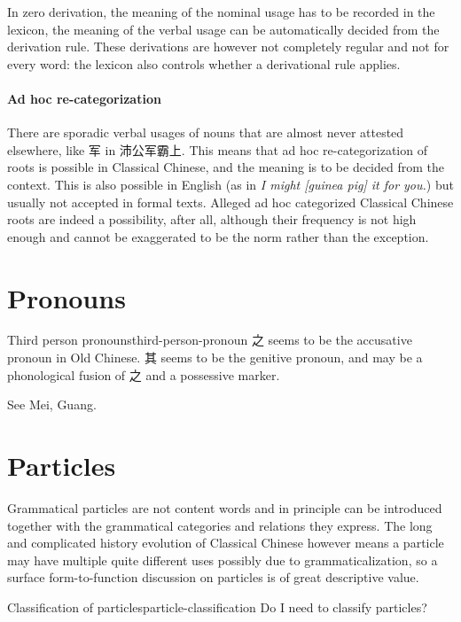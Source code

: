 \documentclass[UTF8, a4paper, oneside, scheme=plain, 12pt]{ctexrep}
\newcommand{\form}[1]{\emph{#1}}
\begin{document}
In zero derivation, the meaning of the nominal usage has to be recorded in the lexicon,
the meaning of the verbal usage can be automatically decided from the derivation rule.
These derivations are however not completely regular and not for every word:
the lexicon also controls whether a derivational rule applies.

\paragraph*{Ad hoc re-categorization}
There are sporadic verbal usages of nouns that are almost never attested elsewhere,
like 军 in 沛公军霸上.
This means that ad hoc re-categorization of roots is possible in Classical Chinese,
and the meaning is to be decided from the context.
This is also possible in English
(as in \form{I might [guinea pig] it for you.}) 
but usually not accepted in formal texts.
Alleged ad hoc categorized Classical Chinese roots are indeed a possibility, after all,
although their frequency is not high enough and cannot be exaggerated to be the norm rather than the exception.

\section{Pronouns}

\begin{todobox}{Third person pronouns}{third-person-pronoun}
    之 seems to be the accusative pronoun in Old Chinese.
    其 seems to be the genitive pronoun,
    and may be a phonological fusion of 之 and a possessive marker.
    
    See Mei, Guang.
\end{todobox}

\section{Particles}

Grammatical particles are not content words
and in principle can be introduced together with the grammatical categories and relations they express.
The long and complicated history evolution of Classical Chinese
however means a particle may have multiple quite different uses
possibly due to grammaticalization,
so a surface form-to-function discussion on particles is of great descriptive value.

\begin{todobox}{Classification of particles}{particle-classification}
    Do I need to classify particles?
\end{todobox}
\end{document}
